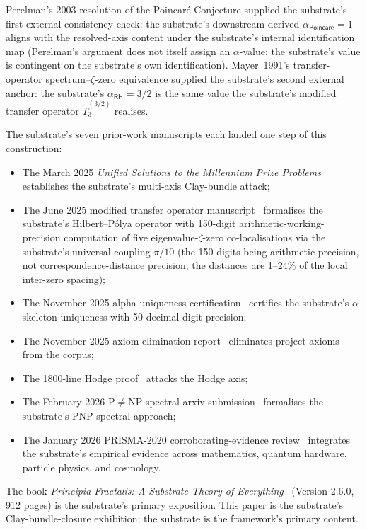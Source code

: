 \documentclass[11pt,a4paper]{amsart}
\theoremstyle{plain}
\theoremstyle{definition}
\begin{document}
Perelman's 2003 resolution of the Poincar\'e Conjecture supplied the substrate's first external consistency check: the substrate's downstream-derived $\alpha_{\textsf{Poincar\'e}}=1$ aligns with the resolved-axis content under the substrate's internal identification map (Perelman's argument does not itself assign an $\alpha$-value; the substrate's value is contingent on the substrate's own identification). Mayer~1991's transfer-operator spectrum--$\zeta$-zero equivalence supplied the substrate's second external anchor: the substrate's $\alpha_{\textsf{RH}}=3/2$ is the same value the substrate's modified transfer operator $\widetilde{T}_3^{(3/2)}$ realises.

The substrate's seven prior-work manuscripts each landed one step of this construction:
\begin{itemize}[itemsep=2pt]
\item The March 2025 \emph{Unified Solutions to the Millennium Prize Problems}~\cite{cohen2025unifiedClay} establishes the substrate's multi-axis Clay-bundle attack;
\item The June 2025 modified transfer operator manuscript~\cite{cohen2025transferOp} formalises the substrate's Hilbert--P\'olya operator with 150-digit arithmetic-working-precision computation of five eigenvalue-$\zeta$-zero co-localisations via the substrate's universal coupling $\pi/10$ (the 150 digits being arithmetic precision, not correspondence-distance precision; the distances are 1--24\% of the local inter-zero spacing);
\item The November 2025 alpha-uniqueness certification~\cite{cohen2025alphaUniqueness} certifies the substrate's $\alpha$-skeleton uniqueness with 50-decimal-digit precision;
\item The November 2025 axiom-elimination report~\cite{cohen2025axiomElim} eliminates project axioms from the corpus;
\item The 1800-line Hodge proof~\cite{cohen2025hodgeProof} attacks the Hodge axis;
\item The February 2026 P$\neq$NP spectral arxiv submission~\cite{cohen2026pnpSpectral} formalises the substrate's PNP spectral approach;
\item The January 2026 PRISMA-2020 corroborating-evidence review~\cite{cohen2026corroborating} integrates the substrate's empirical evidence across mathematics, quantum hardware, particle physics, and cosmology.
\end{itemize}

The book \emph{Principia Fractalis: A Substrate Theory of Everything}~\cite{cohen2026book} (Version 2.6.0, 912 pages) is the substrate's primary exposition. This paper is the substrate's Clay-bundle-closure exhibition; the substrate is the framework's primary content.
\end{document}
